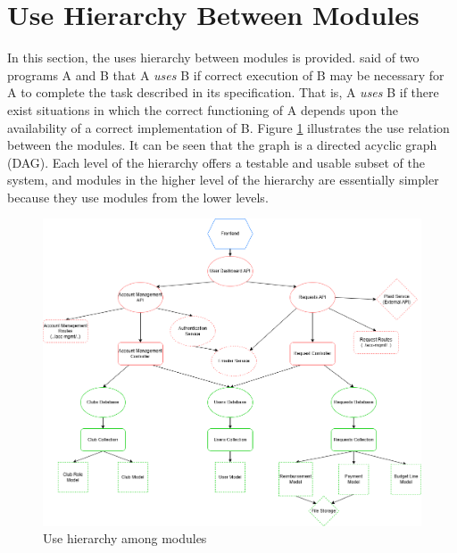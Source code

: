 \documentclass[12pt, titlepage]{article}
\begin{document}
\newpage

\section{Use Hierarchy Between Modules} \label{SecUse}

In this section, the uses hierarchy between modules is
provided. \citet{Parnas1978} said of two programs A and B that A {\em uses} B if
correct execution of B may be necessary for A to complete the task described in
its specification. That is, A {\em uses} B if there exist situations in which
the correct functioning of A depends upon the availability of a correct
implementation of B.  Figure \ref{FigUH} illustrates the use relation between
the modules. It can be seen that the graph is a directed acyclic graph
(DAG). Each level of the hierarchy offers a testable and usable subset of the
system, and modules in the higher level of the hierarchy are essentially simpler
because they use modules from the lower levels.



\begin{figure}[H]
\includegraphics[width=1.1\textwidth]{imgs/UsesHierarchy.png}
\caption{Use hierarchy among modules}
\label{FigUH}
\end{figure}
\end{document}
